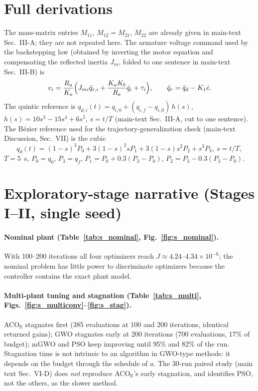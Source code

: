 \documentclass[10pt,journal,compsoc]{IEEEtran}
\newcommand{\mgwo}{mGWO}
\newcommand{\acor}{ACO$_\mathbb{R}$}
\begin{document}
\section{Full derivations}\label{sec:s3}
The mass-matrix entries $M_{11}$, $M_{12}=M_{21}$, $M_{22}$ are already given in main-text Sec.~III-A; they are not repeated here. The armature voltage command used by the backstepping law (obtained by inverting the motor equation and compensating the reflected inertia $J_m$, folded to one sentence in main-text Sec.~III-B) is
\begin{equation}
v_i=\frac{R_a}{K_a}\Bigl(J_{mi}\ddot q_{r,i}+\frac{K_aK_b}{R_a}\dot q_i+\tau_i\Bigr),\qquad \ddot q_r=\ddot q_d-K_1\dot e.
\label{eq:s_bsv}
\end{equation}
The quintic reference is $q_{d,i}(t)=q_{i,0}+(q_{i,f}-q_{i,0})\,h(s)$, $h(s)=10s^3-15s^4+6s^5$, $s=t/T$ (main-text Sec.~III-A, cut to one sentence). The B\'ezier reference used for the trajectory-generalization check (main-text Discussion, Sec.~VII) is the cubic
\begin{equation}
q_d(t)=(1-s)^3P_0+3(1-s)^2sP_1+3(1-s)s^2P_2+s^3P_3,\ s=t/T,
\label{eq:s_bezier}
\end{equation}
$T=5$~s, $P_0=q_0$, $P_3=q_f$, $P_1=P_0+0.3(P_3-P_0)$, $P_2=P_3-0.3(P_3-P_0)$.

\section{Exploratory-stage narrative (Stages I--II, single seed)}\label{sec:s4}
\paragraph{Nominal plant (Table~\ref{tab:s_nominal}, Fig.~\ref{fig:s_nominal}).} With 100--200 iterations all four optimizers reach $J\approx4.24$--$4.34\times10^{-6}$; the nominal problem has little power to discriminate optimizers because the controller contains the exact plant model.

\paragraph{Multi-plant tuning and stagnation (Table~\ref{tab:s_multi}, Figs.~\ref{fig:s_multiconv}--\ref{fig:s_stag}).} \acor{} stagnates first (385 evaluations at 100 and 200 iterations, identical returned gains); GWO stagnates early at 200 iterations (700 evaluations, 17\% of budget); \mgwo{} and PSO keep improving until 95\% and 82\% of the run. Stagnation time is not intrinsic to an algorithm in GWO-type methods: it depends on the budget through the schedule of $a$. The 30-run paired study (main text Sec.~VI-D) does \emph{not} reproduce \acor{}'s early stagnation, and identifies PSO, not the others, as the slower method.
\end{document}
